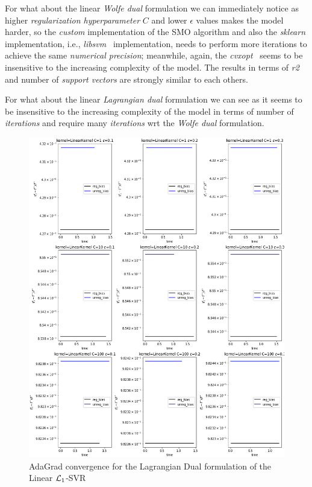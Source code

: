 For what about the linear \emph{Wolfe dual} formulation we can immediately notice as higher \emph{regularization hyperparameter} $C$ and lower $\epsilon$ values makes the model harder, so the \emph{custom} implementation of the SMO algorithm and also the \emph{sklearn} implementation, i.e., \emph{libsvm}~\cite{chang2011libsvm} implementation, needs to perform more iterations to achieve the same \emph{numerical precision}; meanwhile, again, the \emph{cvxopt}~\cite{vandenberghe2010cvxopt} seems to be insensitive to the increasing complexity of the model. The results in terms of \emph{r2} and number of \emph{support vectors} are strongly similar to each others.



For what about the linear \emph{Lagrangian dual} formulation we can see as it seems to be insensitive to the increasing complexity of the model in terms of number of \emph{iterations} and require many \emph{iterations} wrt the \emph{Wolfe dual} formulation.

\begin{figure}[H]
	\centering
	\includegraphics[scale=0.55]{img/linear_lagrangian_dual_l1_svr_loss_history}
	\caption{AdaGrad convergence for the Lagrangian Dual formulation of the Linear $\protect \mathcal{L}_1$-SVR}
	\label{fig:linear_lagrangian_dual_l1_svr_loss_history}
\end{figure}

